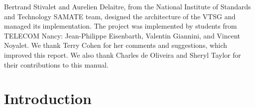 \begin{titlepage}
Bertrand Stivalet and Aurelien Delaitre, from the
National Institute of Standards and Technology SAMATE team, designed the
architecture of the VTSG and managed its implementation.  The project was
implemented by students from TELECOM Nancy: Jean-Philippe Eisenbarth, Valentin
Giannini, and Vincent Noyalet.  We thank Terry Cohen for her comments and
suggestions, which improved this report.  We also thank
Charles de Oliveira and Sheryl Taylor for their contributions to this manual.
%
%
%
%

\end{titlepage}
\pagestyle{fancy}
\renewcommand{\headrulewidth}{0pt}
  \fancyhead{}
  \fancyhead[l]{\small \pubnumber \\
	\small \pubmonth~\pubyear \\}

\newpage

\section{Introduction}

